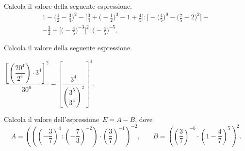 \begin{esercizio}[\Ast]%
 Calcola il valore della seguente espressione.
\begin{multline*}
1-\bigg(\frac{1}{2}-\frac{3}{4}\bigg)^{2}-\bigg[\frac{3}{4}+\bigg(-{\frac{1}{2}}\bigg)^{3}-1+\frac{4}{5}\bigg]:%
\bigg[-\bigg(\frac{4}{5}\bigg)^{0}-\bigg(\frac{7}{5}-2\bigg)^{2}\bigg]+\\%
-\frac{3}{2}+\bigg[\bigg(-{\frac{4}{5}}\bigg)^{-3}\bigg]^{2}:\bigg(-{\frac{4}{5}}\bigg)^{-5}.
\end{multline*}
\end{esercizio}

\begin{esercizio}[\Ast]%
 Calcola il valore della seguente espressione.
 
$\dfrac{\left[\left(\dfrac{20^4}{2^4}\right)\cdot 3^4\right]^2}{30^6}-\left[\dfrac{3^4}{\left(\dfrac{3^5}{3^4}\right)^2}\right]^3$.
\end{esercizio}

\begin{esercizio}%
Calcola il valore dell'espressione~$E = A- B$, dove
\[A=\left(\left(\left(-{\frac{3}{7}}\right)^{4}:\left(-{\frac{7}{3}}\right)^{-2}\right)\cdot%
\left(\frac{3}{7}\right)^{-1}\right)^{-2}\text{,}\qquad
B=\left(\left(\frac{3}{7}\right)^{-6}\cdot%
\left(1-\frac{4}{7}\right)^{5}\right)^{2}.\]
 \end{esercizio}

